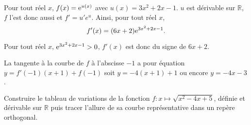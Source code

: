 \documentclass[11pt,fleqn]{book} %
\begin{document}
\begin{solution}Pour tout réel $x$, $f(x)=\mathrm{e}^{u(x)}$ avec $u(x)=3x^2+2x-1$. $u$ est dérivable sur $\mathbb{R}$, $f$ l'est donc aussi et $f'=u'e^u$. Ainsi, pour tout réel $x$, 
\[f'(x)=(6x+2)\mathrm{e}^{3x^2+2x-1}.\]

Pour tout réel $x$, $\mathrm{e}^{3x^2+2x-1}>0$, $f'(x)$ est donc du signe de $6x+2$.

\begin{center}
\end{center}

La tangente à la courbe de $f$ à l'abscisse $-1$ a pour équation $y=f'(-1)(x+1)+f(-1)$ soit $y=-4(x+1)+1$ ou encore $y=-4x-3$.\end{solution}




\begin{exercise}Construire le tableau de variations de la fonction $f:x\mapsto \sqrt{x^2-4x+5}$, définie et dérivable sur $\mathbb{R}$  puis tracer l'allure de sa courbe représentative dans un repère orthogonal.\end{exercise}
\end{document}
